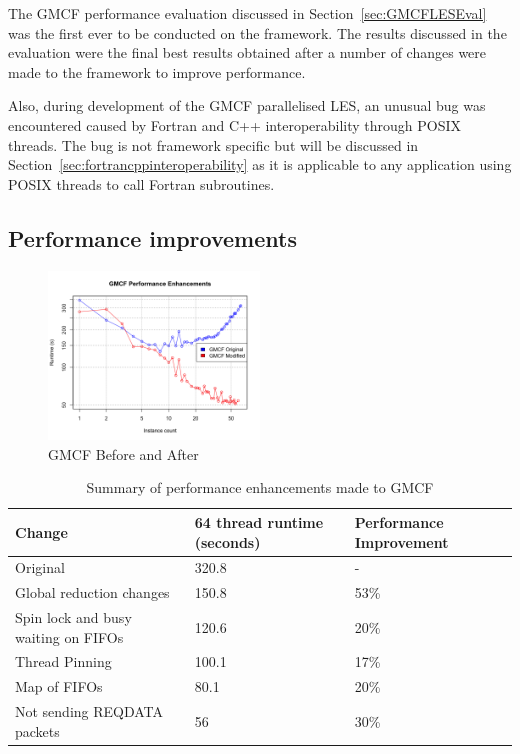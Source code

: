 The GMCF performance evaluation discussed in Section~\ref{sec:GMCFLESEval} was
the first ever to be conducted on the framework. The results discussed in the
evaluation were the final best results obtained after a number of changes were
made to the framework to improve performance.

Also, during development of the GMCF parallelised LES, an unusual bug was
encountered caused by Fortran and C++ interoperability through POSIX threads.
The bug is not framework specific but will be discussed in
Section~\ref{sec:fortrancppinteroperability} as it is applicable to any
application using POSIX threads to call Fortran subroutines.

\subsection{Performance improvements}

\begin{figure}
    \includegraphics[width=0.5\textwidth]
    {graphs/GMCF-before-after-fixed-area.png}
    \caption{GMCF Before and After}
    \label{fig:gmcfbeforeandafter}
\end{figure}

\begin{table}[t]
    \centering
    \begin{tabular}{|l|l|l|}
        \hline
        Change & 64 thread runtime (seconds) & Performance Improvement\\
        \hline
        Original & 320.8 & -\\
        \hline
        Global reduction changes & 150.8 & 53\%\\
        \hline
        Spin lock and busy waiting on FIFOs & 120.6 & 20\%\\
        \hline
        Thread Pinning & 100.1 & 17\%\\
        \hline
        Map of FIFOs & 80.1 & 20\%\\
        \hline
        Not sending REQDATA packets & 56 & 30\%\\
        \hline
    \end{tabular}
    \caption{Summary of performance enhancements made to GMCF}
    \label{tab:gmcfperformanceimprovements}
\end{table}

